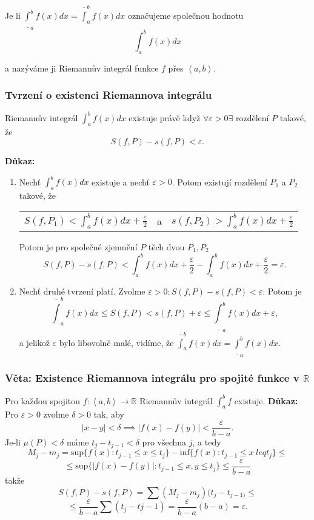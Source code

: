 \documentclass[../main.tex]{subfiles}
\begin{document}
Je li $\underline{\int}^b_a f(x) dx = \overline{\int}^b_a f(x) dx$ označujeme společnou hodnotu
\[\int^b_a f(x) dx\]

a nazýváme ji Riemannův integrál funkce $f$ přes $\left<a,b\right>$.
\noindent
\subsubsection{Tvrzení o existenci Riemannova integrálu}
\hspace{1.2mm}
Riemannův integrál $\int^b_a f(x) dx$ existuje právě když $\forall \varepsilon > 0 \exists$ rozdělení $P$ takové, že
\[S(f,P) - s(f,P) < \varepsilon.\]

\vspace{5mm}
\noindent
\textbf{Důkaz:} 
\begin{enumerate}
    \item Nechť $\int^b_a f(x) dx$ existuje a nechť $\varepsilon > 0$. Potom existují rozdělení $P_1$ a $P_2$ takové, že
    \begin{center}
        \begin{tabular}{ c c c }
            $S(f,P_1) < \int^b_a f(x) dx + \frac{\varepsilon}{2}$ & a & $s(f,P_2) > \int^b_a f(x) dx+\frac{\varepsilon}{2}$  \\
        \end{tabular}
    \end{center}
    Potom je pro společné zjemnění $P$ těch dvou $P_1,P_2$
    \[S(f,P) - s(f,P) < \int^b_a f(x)dx + \frac{\varepsilon}{2} - \int^b_a f(x)dx + \frac{\varepsilon}{2} = \varepsilon.\]
    \item Nechť druhé tvrzení platí. Zvolme $\varepsilon > 0 : S(f,P) - s(f,P) < \varepsilon.$ Potom je 
    \[\overline{\int}^b_a f(x)dx \leq S(f,P) < s(f,P) + \varepsilon \leq \underline{\int}^b_a f(x)dx + \varepsilon,\]
    a jelikož $\varepsilon$ bylo libovolně malé, vidíme, že $\overline{\int}^b_a f(x)dx = \underline{\int}^b_a f(x)dx.$
\end{enumerate}
\noindent


\subsubsection{Věta: Existence Riemannova integrálu pro spojité funkce v $\mathbb{R}$}
\hspace{1.2mm}
Pro každou spojitou $f : \left<a,b\right> \rightarrow \mathbb{R}$ Riemannův integrál $\int^b_a f$ existuje.
\vspace{5mm}
\noindent
\textbf{Důkaz:} Pro $\varepsilon > 0 $ zvolme $\delta > 0$ tak, aby 
\[|x-y| < \delta \implies |f(x) - f(y)| < \frac{\varepsilon}{b-a}.\]
Je-li $\mu(P) < \delta$ máme $t_j-t_{j-1} < \delta$ pro všechna $j$, a tedy
\[M_j - m_j = \text{sup}\{f(x) : t_{j-1} \leq x \leq t_j\} - \text{inf}\{f(x) : t_{j-1} \leq x \ leq t_j\} \leq\]
\[\leq \text{sup}\{|f(x) - f(y)| : t_{j-1} \leq x,y \leq t_j\} \leq \frac{\varepsilon}{b-a}\]
takže
\[S(f,P) - s(f,P) = \sum (M_j - m_j)(t_j-t_{j-1)}\leq\]
\[\leq \frac{\varepsilon}{b-a}\sum (t_j-t{j-1}) = \frac{\varepsilon}{b-a}(b-a) = \varepsilon.\]
\end{document}
